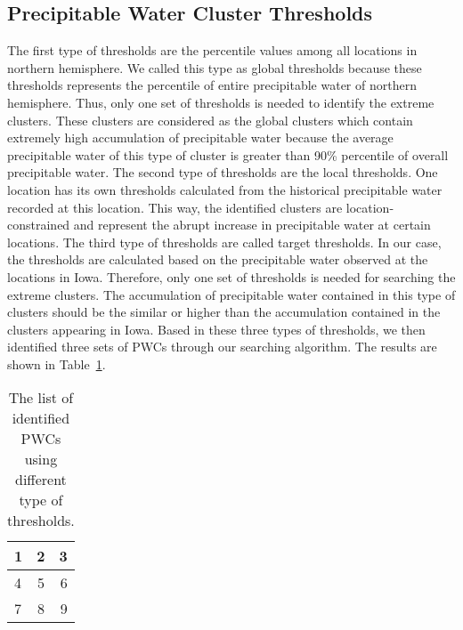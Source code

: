 \documentclass{acm_proc_article-sp}
\begin{document}
\subsection{Precipitable Water Cluster Thresholds}
\label{sec:3typethresholds}
The first type of thresholds are the percentile values among all locations in northern hemisphere. We called this type as global thresholds because these thresholds represents the percentile of entire precipitable water of northern hemisphere. Thus, only one set of thresholds is needed to identify the extreme clusters. These clusters are considered as the global clusters which contain extremely high accumulation of precipitable water because the average precipitable water of this type of cluster is greater than 90\% percentile of overall precipitable water.  
\newline 
The second type of thresholds are the local thresholds. One location has its own thresholds calculated from the historical precipitable water recorded at this location. This way, the identified clusters are location-constrained and represent the abrupt increase in precipitable water at certain locations. 
\newline 
The third type of thresholds are called target thresholds. In our case, the thresholds are calculated based on the precipitable water observed at the locations in Iowa. Therefore, only one set of thresholds is needed for searching the extreme clusters. The accumulation of precipitable water contained in this type of clusters should be the similar or higher than the accumulation contained in the clusters appearing in Iowa. 
\newline
Based in these three types of thresholds, we then identified three sets of PWCs through our searching algorithm. The results are shown in Table~\ref{tab:thresholds}.
\begin{table}
\centering
\caption{The list of identified PWCs using different type of thresholds.}
\begin{tabular}{| l | c | r |}
    \hline
    1 & 2 & 3 \\ \hline
    4 & 5 & 6 \\ \hline
    7 & 8 & 9 \\
    \hline
\end{tabular}
\label{tab:thresholds}
\end{table}
\end{document}

